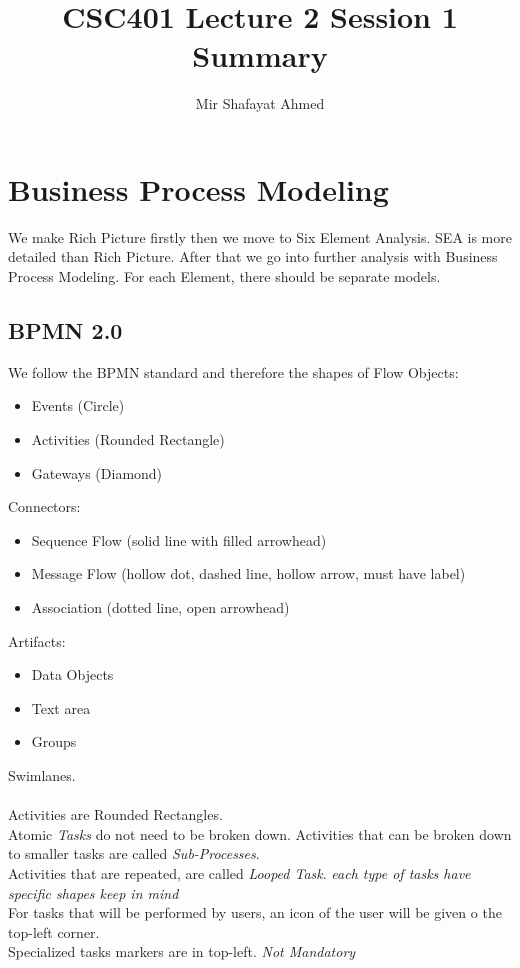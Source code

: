 \documentclass{article}
\title{CSC401 Lecture 2 Session 1 Summary}
\author{Mir Shafayat Ahmed}
\begin{document}
    \pagecolor[HTML]{FFFFCC}
    \maketitle
    \section*{Business Process Modeling}
        We make Rich Picture firstly then we move to Six Element Analysis. SEA is more detailed than Rich Picture. After that we go into further analysis with Business Process Modeling.
        For each Element, there should be separate models.
        \subsection*{BPMN 2.0}
            We follow the BPMN standard and therefore the shapes of Flow Objects:
            \begin{itemize}
                \item Events (Circle)
                \item Activities (Rounded Rectangle)
                \item Gateways (Diamond)
            \end{itemize}
            Connectors: 
            \begin{itemize}
                \item Sequence Flow (solid line with filled arrowhead)
                \item Message Flow (hollow dot, dashed line, hollow arrow, must have label)
                \item Association (dotted line, open arrowhead)
            \end{itemize}
            Artifacts:
            \begin{itemize}
                \item Data Objects
                \item Text area
                \item Groups
            \end{itemize}
            Swimlanes.

            \paragraph{}
            Activities are Rounded Rectangles.\\
            Atomic \emph{Tasks} do not need to be broken down.
            Activities that can be broken down to smaller tasks are called \emph{Sub-Processes}.\\
            Activities that are repeated, are called \emph{Looped Task}.
            \emph{each type of tasks have specific shapes keep in mind}\\
            For tasks that will be performed by users, an icon of the user will be given o the top-left corner.\\
            Specialized tasks markers are in top-left. \emph{Not Mandatory}\\
\end{document}
